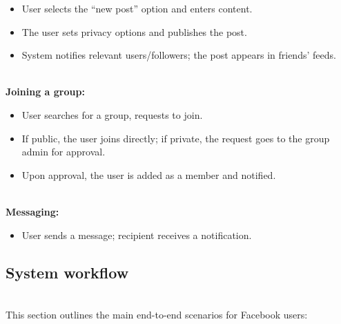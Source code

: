 \begin{itemize}
\item
\protect{}\label{GxVUBgBGsLJ7PitsLV842}
User selects the ``new post'' option and enters content.
\item
\protect{}\label{4X8PfLi53k0qp77g2XkCB}
The user sets privacy options and publishes the post.
\item
\protect{}\label{gd9kJ-neu5bfpjTcV7jv_}
System notifies relevant users/followers; the post appears in friends' feeds.
\end{itemize}
\\
\textbf{Joining a group:}

\begin{itemize}
\item
\protect{}\label{_nglDjKKh-lDB2z1KjP2O}
User searches for a group, requests to join.
\item
\protect{}\label{dKX3IG0kGSJeI8wSvSfRy}
If public, the user joins directly; if private, the request goes to the group admin for approval.
\item
\protect{}\label{rvbzXcDsI-0fKC3wIwr78}
Upon approval, the user is added as a member and notified.
\end{itemize}
\\
\textbf{Messaging:}

\begin{itemize}
\item
\protect{}\label{VNfone3bx1V7j2Lxg_Bim}
User sends a message; recipient receives a notification.
\end{itemize}

\subsection{System workflow}\label{B4E9s4q3UBZaDVVNZVRL7}
\\
This section outlines the main end-to-end scenarios for Facebook users:

